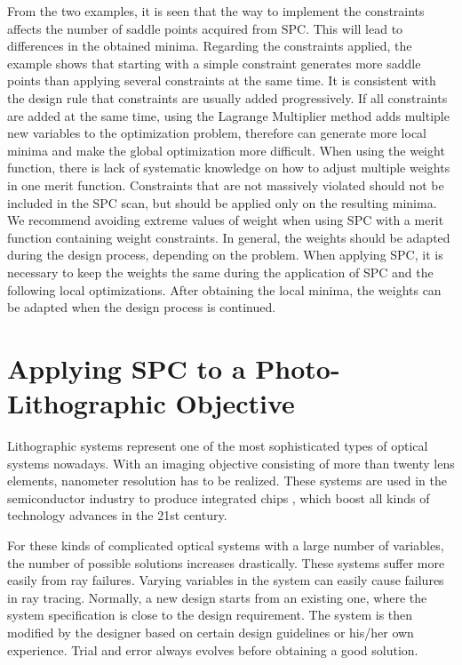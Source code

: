 From the two examples, it is seen that the way to implement the constraints affects the number of saddle points acquired from SPC. This will lead to differences in the obtained minima. Regarding the constraints applied, the example shows that starting with a simple constraint generates more saddle points than applying several constraints at the same time. It is consistent with the design rule that constraints are usually added progressively. If all constraints are added at the same time, using the Lagrange Multiplier method adds multiple new variables to the optimization problem, therefore can generate more local minima and make the global optimization more difficult. When using the weight function, there is lack of systematic knowledge on how to adjust multiple weights in one merit function. Constraints that are not massively violated should not be included in the SPC scan, but should be applied only on the resulting minima. We recommend avoiding extreme values of weight when using SPC with a merit function containing weight constraints. In general, the weights should be adapted during the design process, depending on the problem. When applying SPC, it is necessary to keep the weights the same during the application of SPC and the following local optimizations. After obtaining the local minima, the weights can be adapted when the design process is continued. 

\section{Applying SPC to a Photo-Lithographic Objective}
Lithographic systems represent one of the most sophisticated types of optical systems nowadays. With an imaging objective consisting of more than twenty lens elements, nanometer resolution has to be realized. These systems are used in the semiconductor industry to produce integrated chips \cite{Matsuyama2006_LithoHis}, which boost all kinds of technology advances in the 21st century. 

For these kinds of complicated optical systems with a large number of variables, the number of possible solutions increases drastically. These systems suffer more easily from ray failures. Varying variables in the system can easily cause failures in ray tracing. Normally, a new design starts from an existing one, where the system specification is close to the design requirement. The system is then modified by the designer based on certain design guidelines \cite{LivshitsQA2013}\cite{Shafer1995_moreless}\cite{Cao2017_GroupDesign} or his/her own experience. Trial and error always evolves before obtaining a good solution. 

